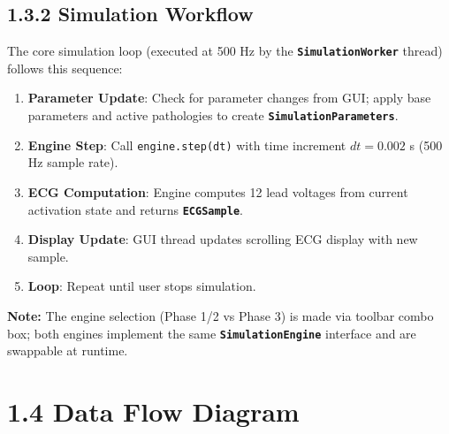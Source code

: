 \documentclass[12pt,oneside,a4paper]{book}
\newcommand{\code}[1]{\texttt{#1}}
\newcommand{\class}[1]{\textbf{\code{#1}}}
\newcommand{\note}[1]{\textbf{Note:} #1}
\begin{document}
\subsection{1.3.2 Simulation Workflow}

The core simulation loop (executed at 500 Hz by the \class{SimulationWorker} thread) follows this sequence:

\begin{enumerate}
  \item \textbf{Parameter Update}: Check for parameter changes from GUI; apply base parameters and active pathologies to create \class{SimulationParameters}.
  \item \textbf{Engine Step}: Call \code{engine.step(dt)} with time increment $dt = 0.002$ s (500 Hz sample rate).
  \item \textbf{ECG Computation}: Engine computes 12 lead voltages from current activation state and returns \class{ECGSample}.
  \item \textbf{Display Update}: GUI thread updates scrolling ECG display with new sample.
  \item \textbf{Loop}: Repeat until user stops simulation.
\end{enumerate}

\note{The engine selection (Phase 1/2 vs Phase 3) is made via toolbar combo box; both engines implement the same \class{SimulationEngine} interface and are swappable at runtime.}

\section{1.4 Data Flow Diagram}
\end{document}
